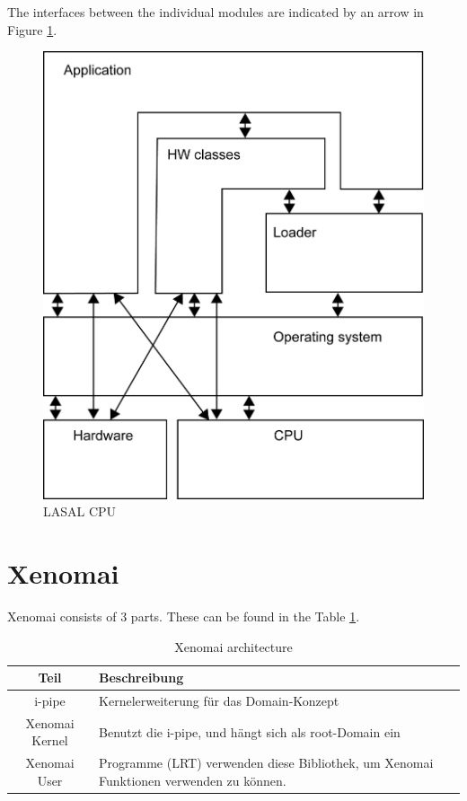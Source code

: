 \documentclass[MMR,Master,english]{twbook}
\begin{document}
\noindent The interfaces between the individual modules are indicated by an arrow in Figure \ref{fig:lasal_cpu}.

\begin{figure}[H]
	\centering
	\includegraphics[width=0.8\columnwidth]{img/Software-Struktur_einer_LASAL_CPU.png}
	\caption[LASAL CPU]{LASAL CPU}
	\label{fig:lasal_cpu}
\end{figure}
\clearpage
\section{Xenomai}

\noindent Xenomai consists of 3 parts. These can be found in the Table \ref{tab:what_is_xenomai}.

\begin{table}[!h]
	\centering
	\caption[Xenomai architecture]{Xenomai architecture}
	\label{tab:what_is_xenomai}
	\setlength{\tabcolsep}{0.5em} %
	{\renewcommand{\arraystretch}{1.2}%
		\begin{tabular}{|c|p{}|}
			\hline
			\textbf{Teil}  & \textbf{Beschreibung}                                                                  \\ \hline
			i-pipe         & Kernelerweiterung für das Domain-Konzept                                               \\ \hline
			Xenomai Kernel & Benutzt die i-pipe, und hängt sich als root-Domain ein                                 \\ \hline
			Xenomai User   & Programme (LRT) verwenden diese Bibliothek, um Xenomai Funktionen verwenden zu können. \\ \hline
		\end{tabular}}
\end{table}
\end{document}
